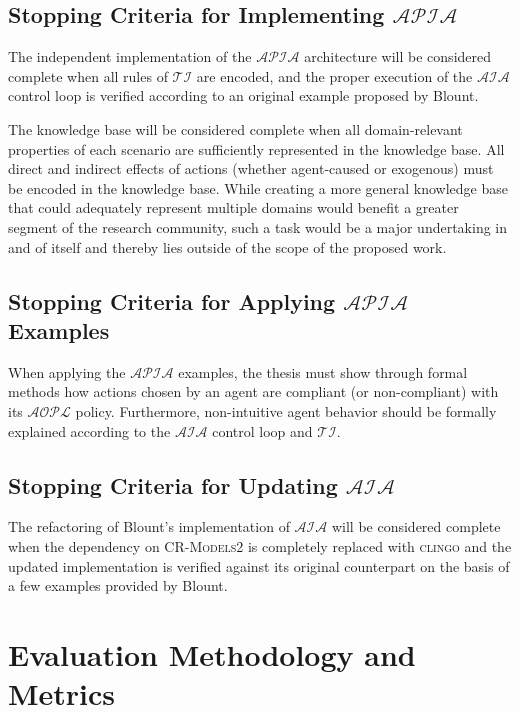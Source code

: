\subsection{Stopping Criteria for Implementing $\mathcal{APIA}$}

The independent implementation of the $\mathcal{APIA}$ architecture will be considered complete when all rules of $\mathcal{TI}$ are encoded, and the proper execution of the $\mathcal{AIA}$ control loop is verified according to an original example proposed by Blount.

The knowledge base will be considered complete when all domain-relevant properties of each scenario are sufficiently represented in the knowledge base.
All direct and indirect effects of actions (whether agent-caused or exogenous) must be encoded in the knowledge base.
While creating a more general knowledge base that could adequately represent multiple domains would benefit a greater segment of the research community, such a task would be a major undertaking in and of itself and thereby lies outside of the scope of the proposed work.

\subsection{Stopping Criteria for Applying $\mathcal{APIA}$ Examples}

When applying the $\mathcal{APIA}$ examples, the thesis must show through formal methods how actions chosen by an agent are compliant (or non-compliant) with its $\mathcal{AOPL}$ policy.
Furthermore, non-intuitive agent behavior should be formally explained according to the $\mathcal{AIA}$ control loop and $\mathcal{TI}$.

\subsection{Stopping Criteria for Updating $\mathcal{AIA}$}

The refactoring of Blount's implementation of $\mathcal{AIA}$ will be considered complete when the dependency on \textsc{CR-Models2} is completely replaced with \textsc{clingo} and the updated implementation is verified against its original counterpart on the basis of a few examples provided by Blount.

\section{Evaluation Methodology and Metrics}

